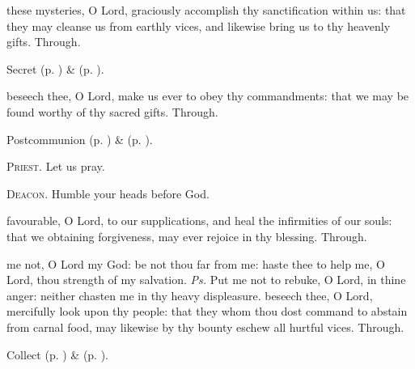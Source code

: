 \clearpage
{}

\secret
{} these mysteries, O Lord, graciously accomplish thy sanctification within us: that they may cleanse us from earthly vices, and likewise bring us to thy heavenly gifts. Through.

\begin{rubric}
     Secret  (p. \pageref{AshWednesdayMassSecret}) \&   (p. \pageref{SPLivingDeparted}).
\end{rubric}


\postcommunion
{} beseech thee, O Lord, make us ever to obey thy commandments: that we may be found worthy of thy sacred gifts. Through.


\begin{rubric}
     Postcommunion  (p. \pageref{AshWednesdayMassPostcommunion}) \&   (p. \pageref{SPLivingDeparted}).
\end{rubric}

\textsc{Priest.} Let us pray.\par
\textsc{Deacon.} Humble your heads before God.\par
{} favourable, O Lord, to our supplications, and heal the infirmities of our souls: that we obtaining forgiveness, may ever rejoice in thy blessing. Through.


\introit
{} me not, O Lord my God: be not thou far from me: haste thee to help me, O Lord, thou strength of my salvation. \textit{Ps.} Put me not to rebuke, O Lord, in thine anger: neither chasten me in thy heavy displeasure.
\collect
{} beseech thee, O Lord, mercifully look upon thy people: that they whom thou dost command to abstain from carnal food, may likewise by thy bounty eschew all hurtful vices. Through.
\begin{rubric}
     Collect  (p. \pageref{AshWednesdayMassCollect}) \&   (p. \pageref{SPLivingDeparted}).
\end{rubric}

